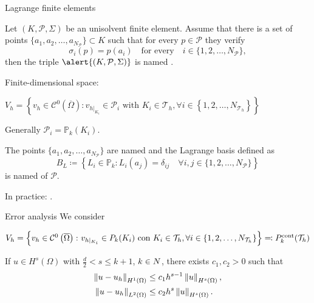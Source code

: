 \begin{frame}{Lagrange finite elements}
	\scriptsize
\begin{definicion}
	Let $\left(K,\mathcal{P},\Sigma\right)$ be an unisolvent finite element. Assume that there is a set of points $\{a_1,a_2,\ldots,a_{N_\mathcal{P}}\}\subset K$ such that for every $p\in\mathcal{P}$ they verify $$\sigma_i(p)=p(a_i)\quad\text{for every}\quad i\in\{1,2,\ldots,N_{\mathcal{P}}\},$$ then the triple $\alert{\left(K,\mathcal{P},\Sigma\right)}$ is named .
\end{definicion}

Finite-dimensional space:
\begin{block}{}
	\begin{center}
	$V_h=\left\{v_h\in \mathcal{C}^0\left(\overline\Omega\right)\colon v_{h|_{K_i}}\in \mathcal{P}_i \text{ with } K_i\in\mathcal{T}_h, \forall i\in\left\{1,2,\ldots,N_{\mathcal{T}_h} \right\}\right\}$
	\end{center}
	\end{block}
	
	
	Generally $\mathcal{P}_i=\mathbb{P}_k(K_i)$.

	\begin{block}{}
		The points $\{a_1,a_2,\ldots,a_{N_\mathcal{P}}\}$ are named  and the Lagrange basis defined as $$B_L\coloneqq\left\{L_i\in\mathbb{P}_k\colon L_i(a_j)=\delta_{ij}\quad\forall i,j\in\{1,2,\ldots,N_\mathcal{P}\} \right\}$$ is named  of $\mathcal{P}$.
	\end{block}

	In practice: .
\end{frame}

\begin{frame}{Error analysis}
	We consider
	\begin{block}{}
		\begin{center}
		{\scriptsize $V_h=\left\{v_h\in \mathcal{C}^0\left(\overline\Omega\right)\colon v_{h|_{K_i}}\in \relax{P}_k(K_i) \text{ con } K_i\in\mathcal{T}_h, \forall i\in\left\{1,2,\ldots,N_{\mathcal{T}_h} \right\}\right\}\eqqcolon\relax{P}^{\text{cont}}_k(\mathcal{T}_h)$}
		\end{center}
	\end{block}

	\vspace*{1cm}
	\begin{theorem}
		If $u\in H^s(\Omega)$ with $\frac{d}{2}<s\le k+1$, $k\in\relax N$, there exists $c_1,c_2>0$ such that
		\begin{align*}
			\left\|u-u_h\right\|_{H^1(\Omega)}&\le c_1 h^{s-1}\left\|u\right\|_{H^s(\Omega)},\\
			\left\|u-u_h\right\|_{L^2(\Omega)}&\le c_2 h^{s}\left\|u\right\|_{H^s(\Omega)}.
		\end{align*}
	\end{theorem}
\end{frame}

